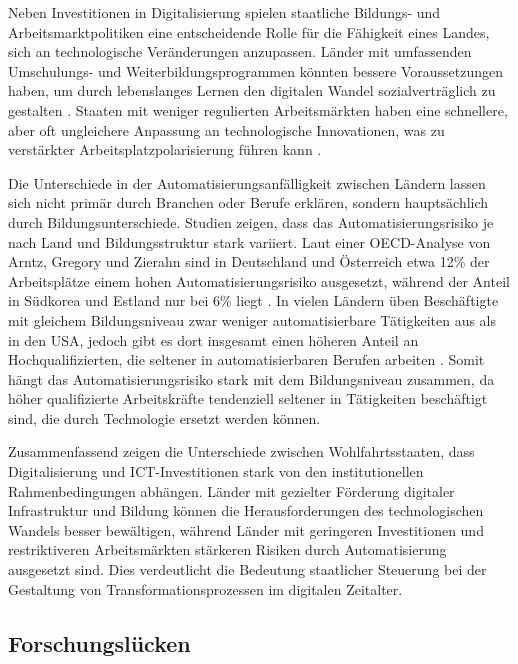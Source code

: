 Neben Investitionen in Digitalisierung spielen staatliche Bildungs- und Arbeitsmarktpolitiken 
eine entscheidende Rolle für die Fähigkeit eines Landes, sich an technologische Veränderungen 
anzupassen. Länder mit umfassenden Umschulungs- und Weiterbildungsprogrammen könnten bessere 
Voraussetzungen haben, um durch lebenslanges Lernen den digitalen Wandel sozialverträglich zu 
gestalten \parencite[vgl.][S. 360]{vu2011ict}. 
Staaten mit weniger regulierten Arbeitsmärkten haben eine schnellere, aber oft ungleichere 
Anpassung an technologische Innovationen, was zu verstärkter Arbeitsplatzpolarisierung führen 
kann \parencite[vgl.][S. 40–41]{hall2001varieties}.

Die Unterschiede in der Automatisierungsanfälligkeit zwischen Ländern lassen sich nicht primär 
durch Branchen oder Berufe erklären, sondern hauptsächlich durch Bildungsunterschiede. Studien 
zeigen, dass das Automatisierungsrisiko je nach Land und Bildungsstruktur stark variiert. Laut 
einer OECD-Analyse von Arntz, Gregory und Zierahn sind in Deutschland und Österreich etwa 12\% 
der Arbeitsplätze einem hohen Automatisierungsrisiko ausgesetzt, während der Anteil in Südkorea 
und Estland nur bei 6\% liegt \parencite[S. 15–16]{arntz2016therisk}. In vielen Ländern üben 
Beschäftigte mit gleichem Bildungsniveau zwar weniger automatisierbare Tätigkeiten aus als in den 
USA, jedoch gibt es dort insgesamt einen höheren Anteil an Hochqualifizierten, die seltener in 
automatisierbaren Berufen arbeiten \parencite[vgl.][S. 16]{arntz2016therisk}. Somit hängt das 
Automatisierungsrisiko stark mit dem Bildungsniveau zusammen, da höher qualifizierte 
Arbeitskräfte tendenziell seltener in Tätigkeiten beschäftigt sind, die durch Technologie ersetzt 
werden können.

Zusammenfassend zeigen die Unterschiede zwischen Wohlfahrtsstaaten, dass Digitalisierung und 
\ac{ICT}-Investitionen stark von den institutionellen Rahmenbedingungen abhängen. Länder mit 
gezielter Förderung digitaler Infrastruktur und Bildung können die Herausforderungen des 
technologischen Wandels besser bewältigen, während Länder mit geringeren Investitionen und 
restriktiveren Arbeitsmärkten stärkeren Risiken durch Automatisierung ausgesetzt sind. Dies 
verdeutlicht die Bedeutung staatlicher Steuerung bei der Gestaltung von Transformationsprozessen 
im digitalen Zeitalter.


\subsection{Forschungslücken}

